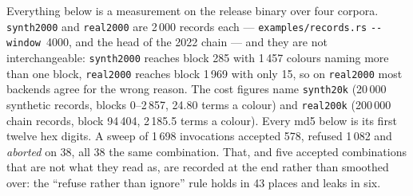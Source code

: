 \documentclass[11pt,a4paper]{article}
\newcommand{\bin}[1]{\texttt{#1}}
\newcommand{\flag}[1]{\texttt{-{}-#1}}
\begin{document}
Everything below is a measurement on the release binary over four corpora.
\texttt{synth2000} and \texttt{real2000} are 2\,000 records each ---
\bin{examples/records.rs} \flag{window}~4000, and the head of the 2022 chain ---
and they are not interchangeable: \texttt{synth2000} reaches block 285 with
1\,457 colours naming more than one block, \texttt{real2000} reaches block
1\,969 with only 15, so on \texttt{real2000} most backends agree for the wrong
reason. The cost figures name \texttt{synth20k} (20\,000 synthetic records,
blocks 0--2\,857, 24.80 terms a colour) and \texttt{real200k} (200\,000 chain
records, block 94\,404, 2\,185.5 terms a colour). Every md5 below is its first
twelve hex digits. A sweep of 1\,698 invocations accepted 578, refused 1\,082
and \emph{aborted} on 38, all 38 the same combination. That, and five accepted
combinations that are not what they read as, are recorded at the end rather
than smoothed over: the ``refuse rather than ignore'' rule holds in 43 places
and leaks in six.
\end{document}
